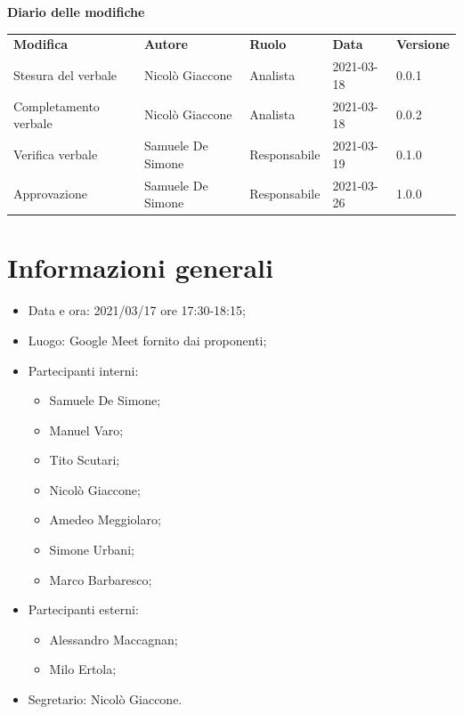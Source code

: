 \documentclass[a4paper]{article}
\begin{document}
    \begin{center}
        \textbf{\Large Diario delle modifiche}\\
        \vspace{10px}
        \begin{table}[h!]
        \centering
        \renewcommand{\arraystretch}{1.8}
        \begin{tabular}{p{150px} p{90px} p{70px} p{60px} p{45px}}
            \rowcolor{logo!70} \textbf{Modifica} & \textbf{Autore} & \textbf{Ruolo} & \textbf{Data} & \textbf{Versione}\\
            Stesura del verbale & Nicolò Giaccone & Analista & 2021-03-18 & 0.0.1 \\    
            Completamento verbale & Nicolò Giaccone & Analista & 2021-03-18 & 0.0.2\\
            Verifica verbale & Samuele De Simone & Responsabile & 2021-03-19 & 0.1.0\\
            Approvazione & Samuele De Simone & Responsabile & 2021-03-26 & 1.0.0\\
        \end{tabular}
    \end{table}
    \end{center}

    \newpage
    \tableofcontents
    \newpage
    \section{Informazioni generali}
    \begin{itemize}
        \item Data e ora: 2021/03/17 ore 17:30-18:15;
        \item Luogo: Google Meet fornito dai proponenti;
        \item Partecipanti interni:  
        \begin{itemize}
            \item  Samuele De Simone;
            \item  Manuel Varo;
            \item  Tito Scutari;
            \item  Nicolò Giaccone;
            \item  Amedeo Meggiolaro;
            \item  Simone Urbani;
            \item  Marco Barbaresco;
        \end{itemize}
        \item Partecipanti esterni: 
        \begin{itemize}
            \item Alessandro Maccagnan; 
            \item Milo Ertola;
        \end{itemize} 
        \item Segretario: Nicolò Giaccone.
    \end{itemize}
\end{document}
